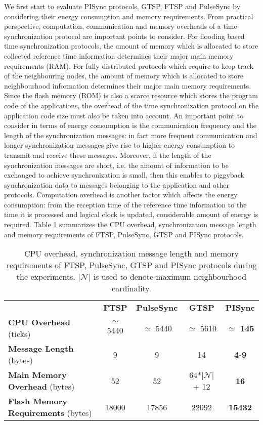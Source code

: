 \documentclass[english,a4paper,10pt,final]{article}
\numberwithin{equation}{section}
\numberwithin{figure}{section}
\begin{document}
We first start to evaluate PISync protocols, GTSP, FTSP and PulseSync by considering their energy consumption and memory requirements. From practical perspective, computation, communication and memory overheads of a time synchronization protocol are important points to consider. For flooding based time synchronization protocols, the amount of memory which is allocated to store collected reference time information determines their major main memory requirements (RAM). For fully distributed protocols which require to keep track of the neighbouring nodes, the amount of memory which is allocated to store neighbourhood information determines their major main memory requirements. Since the flash memory (ROM) is also a scarce resource which stores the program code of the applications, the overhead of the time synchronization protocol on the application code size must also be taken into account. An important point to consider in terms of energy consumption is the communication frequency and the length of the synchronization messages: in fact more frequent communication and longer synchronization messages give rise to higher energy consumption to transmit and receive these messages.  Moreover, if the length of the synchronization messages are short, i.e. the amount of information to be exchanged to achieve synchronization is small, then this enables to piggyback synchronization data to messages belonging to the application and other protocols. Computation overhead is another factor which affects the energy consumption: from the reception time of the reference time information to the time it is processed and logical clock is updated, considerable amount of energy is required. Table \ref{tab:Resource} summarizes the CPU overhead, synchronization message length and memory requirements of FTSP, PulseSync, GTSP and PISync protocols. 

\begin{table}
\center

\caption{CPU overhead, synchronization message length and memory requirements of FTSP, PulseSync, GTSP and PISync protocols during the experiments. $|\mathcal{N}|$ is used to denote maximum neighbourhood cardinality. \label{tab:Resource}}

\begin{tabular}{lcccc}
\multicolumn{1}{l}{} & \textbf{FTSP} & \textbf{PulseSync} & \textbf{GTSP} & \textbf{PISync} \\
\textbf{CPU Overhead }(ticks) & {\scriptsize $\simeq$ 5440} & {\scriptsize $\simeq$ 5440} & {\scriptsize $\simeq$ 5610 } & {\bf \scriptsize $\simeq$ 145 }\\
\textbf{Message Length} (bytes)& {\scriptsize 9  } & {\scriptsize 9  } & {\scriptsize 14 } & {\bf \scriptsize 4-9 }\\ 
\textbf{Main Memory Overhead} (bytes) & {\scriptsize 52  } & {\scriptsize 52 } & {\scriptsize 64{*}$|\mathcal{N}|$ + 12} & {\bf \scriptsize 16}  \\
\textbf{Flash Memory Requirements} (bytes)& {\scriptsize {18000} } & {\scriptsize {17856} } & {\scriptsize {22092} } & \bf {\scriptsize {15432 }}\\ 
\end{tabular}

\end{table}
\end{document}
